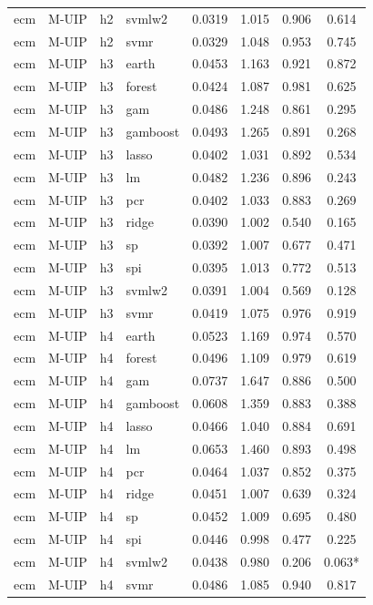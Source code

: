 \begin{ThreePartTable}
\begin{longtable}[t]{llclcccc}
ecm & M-UIP & h2 & svmlw2 & 0.0319 & 1.015 & 0.906 & 0.614\\
ecm & M-UIP & h2 & svmr & 0.0329 & 1.048 & 0.953 & 0.745\\
\addlinespace
ecm & M-UIP & h3 & earth & 0.0453 & 1.163 & 0.921 & 0.872\\
ecm & M-UIP & h3 & forest & 0.0424 & 1.087 & 0.981 & 0.625\\
ecm & M-UIP & h3 & gam & 0.0486 & 1.248 & 0.861 & 0.295\\
ecm & M-UIP & h3 & gamboost & 0.0493 & 1.265 & 0.891 & 0.268\\
ecm & M-UIP & h3 & lasso & 0.0402 & 1.031 & 0.892 & 0.534\\
ecm & M-UIP & h3 & lm & 0.0482 & 1.236 & 0.896 & 0.243\\
ecm & M-UIP & h3 & pcr & 0.0402 & 1.033 & 0.883 & 0.269\\
ecm & M-UIP & h3 & ridge & 0.0390 & 1.002 & 0.540 & 0.165\\
ecm & M-UIP & h3 & sp & 0.0392 & 1.007 & 0.677 & 0.471\\
ecm & M-UIP & h3 & spi & 0.0395 & 1.013 & 0.772 & 0.513\\
ecm & M-UIP & h3 & svmlw2 & 0.0391 & 1.004 & 0.569 & 0.128\\
ecm & M-UIP & h3 & svmr & 0.0419 & 1.075 & 0.976 & 0.919\\
\addlinespace
ecm & M-UIP & h4 & earth & 0.0523 & 1.169 & 0.974 & 0.570\\
ecm & M-UIP & h4 & forest & 0.0496 & 1.109 & 0.979 & 0.619\\
ecm & M-UIP & h4 & gam & 0.0737 & 1.647 & 0.886 & 0.500\\
ecm & M-UIP & h4 & gamboost & 0.0608 & 1.359 & 0.883 & 0.388\\
ecm & M-UIP & h4 & lasso & 0.0466 & 1.040 & 0.884 & 0.691\\
ecm & M-UIP & h4 & lm & 0.0653 & 1.460 & 0.893 & 0.498\\
ecm & M-UIP & h4 & pcr & 0.0464 & 1.037 & 0.852 & 0.375\\
ecm & M-UIP & h4 & ridge & 0.0451 & 1.007 & 0.639 & 0.324\\
ecm & M-UIP & h4 & sp & 0.0452 & 1.009 & 0.695 & 0.480\\
ecm & M-UIP & h4 & spi & 0.0446 & 0.998 & 0.477 & 0.225\\
ecm & M-UIP & h4 & svmlw2 & 0.0438 & 0.980 & 0.206 & 0.063*\\
ecm & M-UIP & h4 & svmr & 0.0486 & 1.085 & 0.940 & 0.817\\

\end{longtable}
\end{ThreePartTable}
